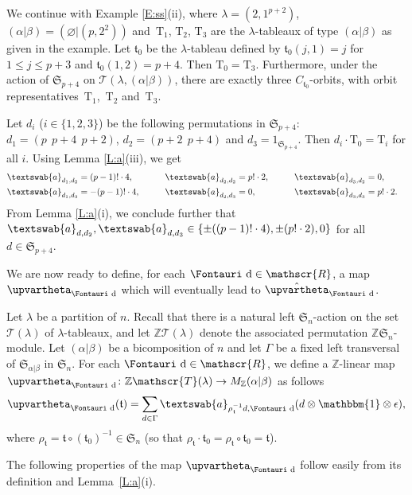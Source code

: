 \documentclass[pdftex]{sigma}
\renewcommand{\t}{\mathfrak{t}}
\renewcommand{\a}{\textswab{a}}
\newcommand{\TT}{\mathscr{T}}
\newcommand{\T}{\mathrm{T}}
\newcommand{\sym}[1]{\mathfrak{S}_{#1}}
\newcommand{\bb}[1]{\mathbbm{{#1}}}
\newcommand{\R}{\mathscr{R}}
\newcommand{\dR}{\text{\Fontauri d}}
\newcommand{\Z}{\mathbb{Z}}
\newcommand{\Jhom}{\upvartheta}
\newcommand{\hJhom}{\hat{\Jhom}}
\begin{document}
\begin{Example} \label{E:a}
We continue with Example \ref{E:ss}(ii), where $\lambda = (2,1^{p+2})$, $(\alpha|\beta) = (\varnothing|(p,2^2))$ and~$\T_1$, $\T_2$, $\T_3$ are the $\lambda$-tableaux of type $(\alpha|\beta)$ as given in the example. Let $\t_0$ be the $\lambda$-tableau defined by $\t_0(j,1) = j$ for $1 \leq j \leq p+3$ and $\t_0(1,2) = p+4$. Then $\T_0 = \T_3$. Furthermore, under the action of $\sym{p+4}$ on $\TT(\lambda, (\alpha|\beta))$, there are exactly three $C_{\t_0}$-orbits, with orbit representatives~$\T_1$,~$\T_2$ and~$\T_3$.

Let $d_i$ ($i \in \{1,2,3\}$) be the following permutations in $\sym{p+4}$: $d_1 = (p\ \ p+4\ \ p+2)$, $d_2 = (p+2\ \ p+4)$ and $d_3 = 1_{\sym{p+4}}$. Then $d_i \cdot \T_0 = \T_i$ for all $i$. Using Lemma \ref{L:a}(iii), we get
\begin{alignat*}{4}
& \a_{d_1,d_2} = (p-1)! \cdot 4, \qquad && \a_{d_2,d_2} = p! \cdot 2, \qquad&& \a_{d_3,d_2}= 0,& \\
& \a_{d_1,d_3} = -(p-1)! \cdot 4, \qquad && \a_{d_2,d_3} = 0, \qquad && \a_{d_3,d_3} = p!\cdot 2.&
\end{alignat*}
From Lemma \ref{L:a}(i), we conclude further that $\a_{d,d_2}, \a_{d,d_3} \in \{ \pm ((p-1)! \cdot 4), \pm (p! \cdot 2), 0 \}$ for all $d \in \sym{p+4}$.
\end{Example}

We are now ready to define, for each $\dR\in \R$, a map $\Jhom_{\dR}$ which will eventually lead to $\hJhom_\dR$.

\begin{Definition}\label{D:theta}
Let $\lambda$ be a partition of $n$. Recall that there is a natural left $\sym{n}$-action on the set $\TT(\lambda)$ of $\lambda$-tableaux, and let $\Z\TT(\lambda)$ denote the associated permutation $\Z\sym{n}$-module. Let $(\alpha|\beta)$ be a bicomposition of $n$ and let $\Gamma$ be a fixed left transversal of $\sym{\alpha|\beta}$ in $\sym{n}$. For each $\dR \in\R$, we define a $\Z$-linear map $\Jhom_{\dR}\colon \Z\TT(\lambda) \to M_\Z(\alpha|\beta)$ as follows
\begin{gather*}\Jhom_{\dR}(\t) = \sum_{d \in \Gamma} \a_{\rho_{\t}^{-1} d,\dR} (d \otimes \bb{1} \otimes \epsilon),\end{gather*}
where $\rho_{\t} = \t \circ (\t_0)^{-1} \in \sym{n}$ (so that $\rho_{\t} \cdot \t_0 = \rho_{\t} \circ \t_0 = \t$).
\end{Definition}

The following properties of the map $\Jhom_{\dR}$ follow easily from its definition and Lem\-ma~\ref{L:a}(i).
\end{document}
